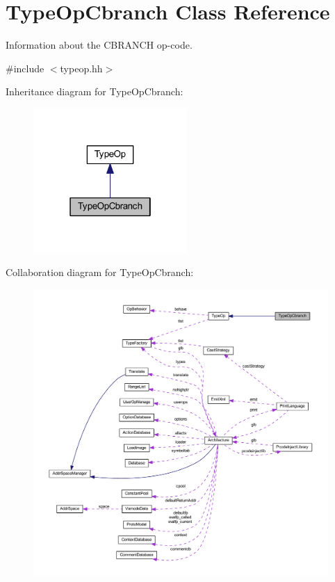\hypertarget{class_type_op_cbranch}{}\section{Type\+Op\+Cbranch Class Reference}
\label{class_type_op_cbranch}


Information about the C\+B\+R\+A\+N\+CH op-\/code.  




{\ttfamily \#include $<$typeop.\+hh$>$}



Inheritance diagram for Type\+Op\+Cbranch\+:
\nopagebreak
\begin{figure}[H]
\begin{center}
\leavevmode
\includegraphics[width=166pt]{class_type_op_cbranch__inherit__graph}
\end{center}
\end{figure}


Collaboration diagram for Type\+Op\+Cbranch\+:
\nopagebreak
\begin{figure}[H]
\begin{center}
\leavevmode
\includegraphics[width=350pt]{class_type_op_cbranch__coll__graph}
\end{center}
\end{figure}
